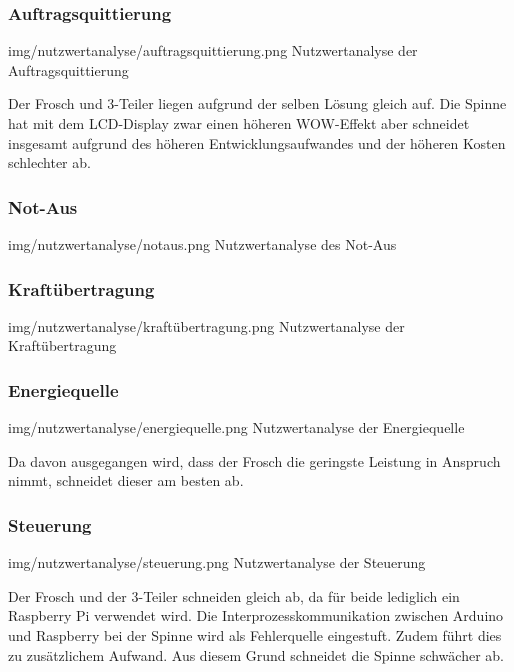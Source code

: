 \subsubsection*{Auftragsquittierung}
\image
   {img/nutzwertanalyse/auftragsquittierung.png}
   {Nutzwertanalyse der Auftragsquittierung}
  
Der Frosch und 3-Teiler liegen aufgrund der selben Lösung gleich auf. Die Spinne hat mit dem LCD-Display zwar einen höheren WOW-Effekt aber schneidet insgesamt aufgrund des höheren Entwicklungsaufwandes und der höheren Kosten schlechter ab.
   
\subsubsection*{Not-Aus}
\image
   {img/nutzwertanalyse/notaus.png}
   {Nutzwertanalyse des Not-Aus}
   
\subsubsection*{Kraftübertragung}
\image
   {img/nutzwertanalyse/kraftübertragung.png}
   {Nutzwertanalyse der Kraftübertragung}
   
\subsubsection*{Energiequelle}
\image
   {img/nutzwertanalyse/energiequelle.png}
   {Nutzwertanalyse der Energiequelle}
   
Da davon ausgegangen wird, dass der Frosch die geringste Leistung in Anspruch nimmt, schneidet dieser am besten ab.

\subsubsection*{Steuerung}
\image
   {img/nutzwertanalyse/steuerung.png}
   {Nutzwertanalyse der Steuerung}

Der Frosch und der 3-Teiler schneiden gleich ab, da für beide lediglich ein Raspberry Pi verwendet wird. Die Interprozesskommunikation zwischen Arduino und Raspberry bei der Spinne wird als Fehlerquelle eingestuft. Zudem führt dies zu zusätzlichem Aufwand. Aus diesem Grund schneidet die Spinne schwächer ab.

